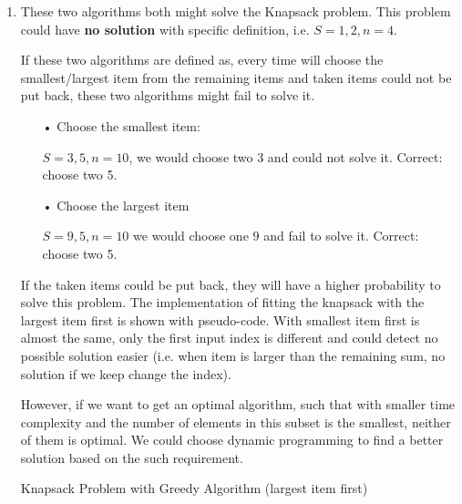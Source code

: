 \documentclass{assignment}
\begin{document}
    \begin{homeworkProblem}
    \begin{enumerate}
    \item These two algorithms both might solve the Knapsack problem. This problem could have \textbf{no solution} with specific definition, i.e. $S={1,2}, n=4$. 
    
    If these two algorithms are defined as, every time will choose the smallest/largest item from the remaining items and taken items could not be put back, these two algorithms might fail to solve it. 
    \begin{enumerate}
    \item[•] Choose the smallest item: 
    
    $S = {3, 5}, n = {10}$, we would choose two $3$ and could not solve it. Correct: choose two 5.
    
    \item[•] Choose the largest item
    
    $S = {9, 5}, n = {10}$ we would choose one $9$ and fail to solve it. Correct: choose two 5.
    \end{enumerate}
    
    
    
    
    If the taken items could be put back, they will have a higher probability to solve this problem. The implementation of fitting the knapsack with the largest item first is shown with pseudo-code. With smallest item first is almost the same, only the first input index is different and could detect no possible solution easier (i.e. when item is larger than the remaining sum, no solution if we keep change the index).
    
     However, if we want to get an optimal algorithm, such that with smaller time complexity and the number of elements in this subset is the smallest, neither of them is optimal. We could choose dynamic programming to find a better solution based on the such requirement.
  
    
    \begin{algorithm}[]
    \BlankLine
{}
\caption{Knapsack Problem with Greedy Algorithm (largest item first)} 
\end{algorithm}


\end{enumerate}
\end{homeworkProblem}
\end{document}
